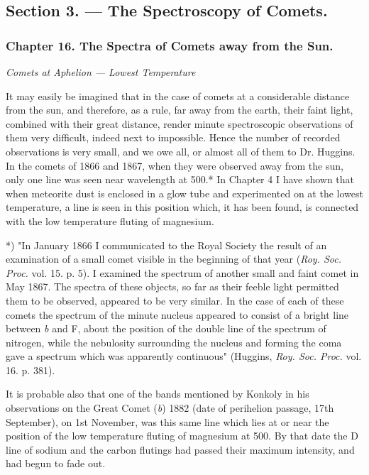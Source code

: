 \documentclass[a4paper, 12pt, oneside, polutonikogreek, english]{article}
\begin{document}
\subsection{Section 3. --- The Spectroscopy of Comets.}

\subsubsection{Chapter 16. The Spectra of Comets away from the Sun.}

\emph{Comets at Aphelion --- Lowest Temperature}

It may easily be imagined that in the case of comets at a considerable distance from the sun, and therefore, as a rule, far away from the earth, their faint light, combined with their great distance, render minute spectroscopic observations of them very difficult, indeed next to impossible. Hence the number of recorded observations is very small, and we owe all, or almost all of them to Dr. Huggins. In the comets of 1866 and 1867, when they were observed away from the sun, only one line was seen near wavelength at 500.* In Chapter 4 I have shown that when meteorite dust is enclosed in a glow tube and experimented on at the lowest temperature, a line is seen in this position which, it has been found, is connected with the low temperature fluting of magnesium.

*) "In January 1866 I communicated to the Royal Society the result of an examination of a small comet visible in the beginning of that year (\emph{Roy. Soc. Proc.} vol. 15. p. 5). I examined the spectrum of another small and faint comet in May 1867. The spectra of these objects, so far as their feeble light permitted them to be observed, appeared to be very similar. In the case of each of these comets the spectrum of the minute nucleus appeared to consist of a bright line between \emph{b} and F, about the position of the double line of the spectrum of nitrogen, while the nebulosity surrounding the nucleus and forming the coma gave a spectrum which was apparently continuous" (Huggins, \emph{Roy. Soc. Proc.} vol. 16. p. 381).

It is probable also that one of the bands mentioned by Konkoly in his observations on the Great Comet (\emph{b}) 1882 (date of perihelion passage, 17th September), on 1st November, was this same line which lies at or near the position of the low temperature fluting of magnesium at 500. By that date the D line of sodium and the carbon flutings had passed their maximum intensity, and had begun to fade out.
\end{document}
